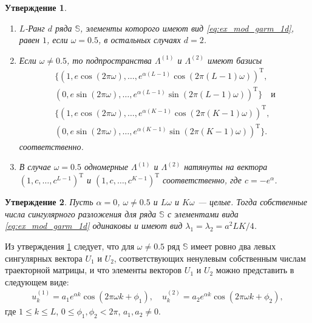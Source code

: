 \documentclass[specialist,
               substylefile = spbu.rtx,
               subf,href,colorlinks=true, 12pt]{disser}
\newtheorem{Th}{Утверждение}
\begin{document}
\begin{Th} \cite[Утверждение 1]{Zhornikova2016} \label{th:ex_mod_1d}
\begin{enumerate}
\item $L$-Ранг $d$ ряда $\mathbb{S}$, элементы которого имеют вид \eqref{eq:ex_mod_garm_1d},  равен $1$, если $\omega = 0.5$, в остальных случаях $d=2$.
\item Если $\omega \not = 0.5$, то подпространства $\Lambda^{(1)}$ и $\Lambda^{(2)}$ имеют базисы \\
\begin{gather*}
\{(1, e\cos(2\pi\omega),\ldots,e^{\alpha (L-1)}\cos(2\pi (L-1) \omega))^\mathrm{T}, \\
(0, e\sin(2\pi\omega),\ldots,e^{\alpha (L-1)}\sin(2\pi (L-1) \omega))^\mathrm{T}\} \quad \text{и} \\
\{(1, e\cos(2\pi\omega),\ldots,e^{\alpha (K-1)}\cos(2\pi (K-1) \omega))^\mathrm{T}, \\
(0, e\sin(2\pi\omega),\ldots,e^{\alpha (K-1)}\sin(2\pi (K-1) \omega))^\mathrm{T}\}.
\end{gather*}
соответственно.
\item В случае $\omega = 0.5$ одномерные $\Lambda^{(1)}$ и $\Lambda^{(2)}$ натянуты на вектора \\ $(1,c,\ldots,c^{L-1})^{\mathrm{T}}$ и $(1,c,\ldots,c^{K-1})^{\mathrm{T}}$ соответственно, где $c = -e^{\alpha}$.
\end{enumerate}
\end{Th}

\begin{Th} \cite[Предложение 2.3]{Golyandina.etal2003} \label{th:1dssa_num}
Пусть $\alpha = 0$, $\omega \not = 0.5$ и $L\omega$  и $K\omega$ --- целые. Тогда собственные числа сингулярного разложения для ряда $\mathbb{S}$ с элементами вида \eqref{eq:ex_mod_garm_1d} одинаковы и имеют вид $\lambda_1=\lambda_2=a^2LK/4$.
\end{Th}

Из утверждения \ref{th:ex_mod_1d} следует, что для $\omega \not = 0.5$ ряд $\mathbb{S}$ имеет ровно два левых сингулярных вектора $U_1$ и $U_2$, соответствующих ненулевым собственным числам траекторной матрицы,
и что элементы векторов $U_1$ и $U_2$ можно представить в следующем виде:
\begin{gather} \label{eq:vectors_ex_mod_1d}
	u_k^{(1)} = a_1 e^{\alpha k} \cos(2\pi\omega k + \phi_1), \quad u_k^{(2)} = a_2 e^{\alpha k}\cos(2\pi\omega k + \phi_2),
\end{gather}
где $1 \leqslant k \leqslant L$, $0 \leqslant \phi_1, \phi_2 < 2\pi$, $a_1, a_2 \not = 0$.
\end{document}
